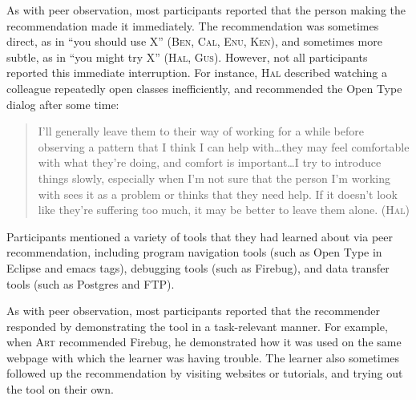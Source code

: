 \documentclass[smallextended]{svjour3}
\newcommand\discpush{peer recommendation\xspace}
\newcommand\discpull{peer observation\xspace}
\newcommand{\subject}[1]{\textsc{#1}}
\newcommand{\dsub}{{\subject{Ben}}\xspace}
\newcommand{\fsub}{{\subject{Art}}\xspace}
\newcommand{\gsub}{{\subject{Hao}}\xspace}
\newcommand{\isub}{{\subject{Gus}}\xspace}
\newcommand{\ksub}{{\subject{Cal}}\xspace}
\newcommand{\osub}{{\subject{Ken}}\xspace}
\newcommand{\psub}{{\subject{Hal}}\xspace}
\newcommand{\qsub}{{\subject{Enu}}\xspace}
\begin{document}







As with \discpull, most participants reported that the person making
the recommendation made it immediately.
The recommendation was sometimes direct, as in ``you should use X'' (\dsub,
\ksub, \qsub, \osub), and sometimes more subtle, as in ``you might try X''
(\psub, \isub).
However, not all participants reported this immediate interruption.
For instance, \psub described watching a colleague repeatedly open classes
inefficiently, and recommended the Open Type dialog after some time:

\begin{quote}
I'll generally leave them to their way of working for a while before observing
a pattern that I think I can help with\ldots they may feel comfortable with what
they're doing, and comfort is important\ldots I try to introduce things slowly,
especially when I'm not sure that the person I'm working with sees it as a
problem or thinks that they need help. 
If it doesn't look like they're suffering too much, it may be better to leave
them alone. (\psub)
\end{quote}



Participants mentioned a variety of tools that they had learned about via \discpush,
including program navigation tools (such as Open Type in Eclipse and emacs tags),
debugging tools (such as Firebug),
and data transfer tools (such as Postgres and FTP).

As with \discpull, most participants reported that the recommender 
responded by demonstrating the tool in a task-relevant manner.
For example, when \fsub recommended Firebug, he demonstrated how it was used on
the same webpage with which the learner was having trouble.
The learner also sometimes followed up the recommendation by visiting
websites or tutorials, and trying out the tool on their own.
\end{document}
